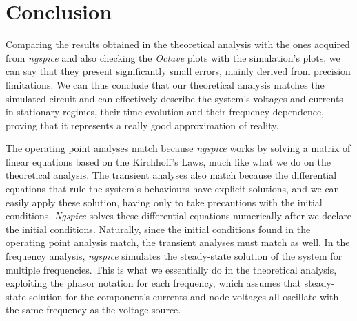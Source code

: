 \section{Conclusion}
\label{sec:conclusion}

Comparing the results obtained in the theoretical analysis  with the ones acquired from \textit{ngspice} and
also checking the \textit{Octave} plots with the simulation's plots, we can say that they present significantly small errors, mainly derived from precision limitations. We can thus conclude
that our theoretical analysis matches the simulated circuit and can effectively describe the system's voltages and currents in stationary regimes,
their time evolution and their frequency dependence, proving that it represents a really good approximation of reality.

\par

The operating point analyses match because \textit{ngspice} works by solving a matrix of linear equations based on the Kirchhoff's Laws, much like
what we do on the theoretical analysis. The transient analyses also match because the differential equations that rule the system's behaviours have
explicit solutions, and we can easily apply these solution, having only to take precautions with the initial conditions. \textit{Ngspice} solves these
differential equations numerically after we declare the initial conditions. Naturally, since the initial conditions found in the operating point analysis match,
the transient analyses must match as well. In the frequency analysis, \textit{ngspice} simulates the steady-state solution of the system for multiple frequencies.
This is what we essentially do in the theoretical analysis, exploiting the phasor notation for each frequency, which assumes that steady-state solution for the component's currents and node
voltages all oscillate with the same frequency as the voltage source.
